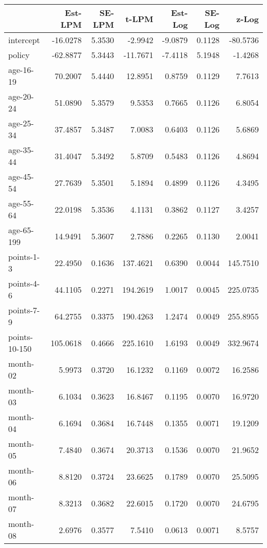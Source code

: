 \documentclass[10pt]{article}
\begin{document}

\begin{table}[ht]
\centering
\begin{tabular}{lrrrrrr}
  \hline
 & Est-LPM & SE-LPM & t-LPM & Est-Log & SE-Log & z-Log \\ 
  \hline
intercept & -16.0278 & 5.3530 & -2.9942 & -9.0879 & 0.1128 & -80.5736 \\ 
  policy & -62.8877 & 5.3443 & -11.7671 & -7.4118 & 5.1948 & -1.4268 \\ 
  age-16-19 & 70.2007 & 5.4440 & 12.8951 & 0.8759 & 0.1129 & 7.7613 \\ 
  age-20-24 & 51.0890 & 5.3579 & 9.5353 & 0.7665 & 0.1126 & 6.8054 \\ 
  age-25-34 & 37.4857 & 5.3487 & 7.0083 & 0.6403 & 0.1126 & 5.6869 \\ 
  age-35-44 & 31.4047 & 5.3492 & 5.8709 & 0.5483 & 0.1126 & 4.8694 \\ 
  age-45-54 & 27.7639 & 5.3501 & 5.1894 & 0.4899 & 0.1126 & 4.3495 \\ 
  age-55-64 & 22.0198 & 5.3536 & 4.1131 & 0.3862 & 0.1127 & 3.4257 \\ 
  age-65-199 & 14.9491 & 5.3607 & 2.7886 & 0.2265 & 0.1130 & 2.0041 \\ 
  points-1-3 & 22.4950 & 0.1636 & 137.4621 & 0.6390 & 0.0044 & 145.7510 \\ 
  points-4-6 & 44.1105 & 0.2271 & 194.2619 & 1.0017 & 0.0045 & 225.0735 \\ 
  points-7-9 & 64.2755 & 0.3375 & 190.4263 & 1.2474 & 0.0049 & 255.8955 \\ 
  points-10-150 & 105.0618 & 0.4666 & 225.1610 & 1.6193 & 0.0049 & 332.9674 \\ 
  month-02 & 5.9973 & 0.3720 & 16.1232 & 0.1169 & 0.0072 & 16.2586 \\ 
  month-03 & 6.1034 & 0.3623 & 16.8467 & 0.1195 & 0.0070 & 16.9720 \\ 
  month-04 & 6.1694 & 0.3684 & 16.7448 & 0.1355 & 0.0071 & 19.1209 \\ 
  month-05 & 7.4840 & 0.3674 & 20.3713 & 0.1536 & 0.0070 & 21.9652 \\ 
  month-06 & 8.8120 & 0.3724 & 23.6625 & 0.1789 & 0.0070 & 25.5095 \\ 
  month-07 & 8.3213 & 0.3682 & 22.6015 & 0.1720 & 0.0070 & 24.6795 \\ 
  month-08 & 2.6976 & 0.3577 & 7.5410 & 0.0613 & 0.0071 & 8.5757 \\ 

\end{tabular}
\end{table}
\end{document}
